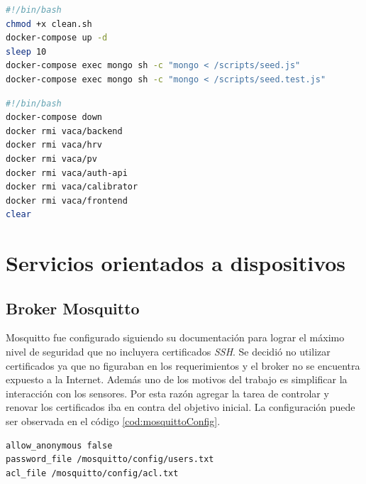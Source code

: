 \begin{lstlisting}[language=bash,label=cod:bashStart,caption=Guión de inicialización.]
#!/bin/bash
chmod +x clean.sh
docker-compose up -d
sleep 10
docker-compose exec mongo sh -c "mongo < /scripts/seed.js"
docker-compose exec mongo sh -c "mongo < /scripts/seed.test.js"
\end{lstlisting}

\begin{lstlisting}[language=bash,label=cod:bashClean,caption=Guión de limpieza.]
#!/bin/bash
docker-compose down
docker rmi vaca/backend
docker rmi vaca/hrv
docker rmi vaca/pv
docker rmi vaca/auth-api
docker rmi vaca/calibrator
docker rmi vaca/frontend
clear
\end{lstlisting}


\section{Servicios orientados a dispositivos}

\subsection{Broker Mosquitto}

Mosquitto fue configurado siguiendo su documentación para lograr el máximo nivel de seguridad que no incluyera certificados \emph{SSH}.
Se decidió no utilizar certificados ya que no figuraban en los requerimientos y el broker no se encuentra expuesto a la Internet.
Además uno de los motivos del trabajo es simplificar la interacción con los sensores.
Por esta razón agregar la tarea de controlar y renovar los certificados iba en contra del objetivo inicial.
La configuración puede ser observada en el código \ref{cod:mosquittoConfig}.

\begin{lstlisting}[label=cod:mosquittoConfig,caption=Archivo mosquitto.conf]
allow_anonymous false
password_file /mosquitto/config/users.txt
acl_file /mosquitto/config/acl.txt
\end{lstlisting}


